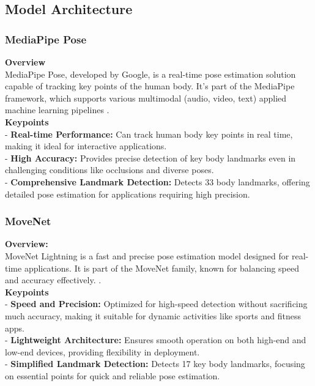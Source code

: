 \documentclass[12pt]{article}
\begin{document}
\subsection{Model Architecture}

\subsubsection{MediaPipe Pose}
\hspace*{1.5em}\textbf{Overview}\\[5pt]
MediaPipe Pose, developed by Google, is a real-time pose estimation solution capable of tracking key points of the human body. It's part of the MediaPipe framework, which supports various multimodal (audio, video, text) applied machine learning pipelines \cite{google2023}.  \\

\textbf{Keypoints}\\[5pt]
\hspace*{1.5em}- \textbf{Real-time Performance:} Can track human body key points in real time, making it ideal for interactive applications.\\[1pt]
\hspace*{1.5em}- \textbf{High Accuracy:} Provides precise detection of key body landmarks even in challenging conditions like occlusions and diverse poses.\\[1pt]
\hspace*{1.5em}- \textbf{Comprehensive Landmark Detection:} Detects 33 body landmarks, offering detailed pose estimation for applications requiring high precision.\\[1pt]

\subsubsection{MoveNet}
\hspace*{1.5em}\textbf{Overview:}\\[5pt]
MoveNet Lightning is a fast and precise pose estimation model designed for real-time applications. It is part of the MoveNet family, known for balancing speed and accuracy effectively. \cite{kaggle2024}.\\

\textbf{Keypoints}\\[5pt]
\hspace*{1.5em}- \textbf{Speed and Precision:} Optimized for high-speed detection without sacrificing much accuracy, making it suitable for dynamic activities like sports and fitness apps.\\[1pt]
\hspace*{1.5em}- \textbf{Lightweight Architecture:} Ensures smooth operation on both high-end and low-end devices, providing flexibility in deployment.\\[1pt]
\hspace*{1.5em}- \textbf{Simplified Landmark Detection:} Detects 17 key body landmarks, focusing on essential points for quick and reliable pose estimation.\\[1pt]
\end{document}
